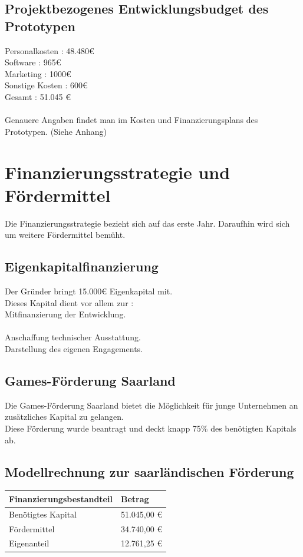 \documentclass[envcountsame,envcountchap deutsch]{i-studis}
\begin{document}
\section{Projektbezogenes Entwicklungsbudget des Prototypen}
Personalkosten : 48.480€\\
Software : 965€\\
Marketing : 1000€ \\
Sonstige Kosten : 600€ \\
Gesamt : 51.045 €\\
\\
Genauere Angaben findet man im Kosten und Finanzierungsplans des Prototypen. (Siehe Anhang)
\chapter{Finanzierungsstrategie und Fördermittel}
Die Finanzierungsstrategie bezieht sich auf das erste Jahr. Daraufhin wird sich um weitere Fördermittel bemüht.
\section{Eigenkapitalfinanzierung}
Der Gründer bringt 15.000€ Eigenkapital mit. \\
Dieses Kapital dient vor allem zur : \\
Mitfinanzierung der Entwicklung. \\ \\
Anschaffung technischer Ausstattung. \\
Darstellung des eigenen Engagements.
\section{Games-Förderung Saarland}
Die Games-Förderung Saarland bietet die Möglichkeit für junge Unternehmen an zusätzliches Kapital zu gelangen. \\
Diese Förderung wurde beantragt und deckt knapp 75\% des benötigten Kapitals ab. 
\section{Modellrechnung zur saarländischen Förderung}

\begin{table}[ht]
	\centering
	\begin{tabular}{|p{6cm}|p{3cm}|}
		\hline
		\textbf{Finanzierungsbestandteil}  &\textbf{Betrag} \\ \hline
		Benötigtes Kapital  & 51.045,00 € \\ \hline
		Fördermittel  & 34.740,00 €\\ \hline
		Eigenanteil  & 12.761,25 € \\ \hline
	\end{tabular}
\end{table}
\end{document}
